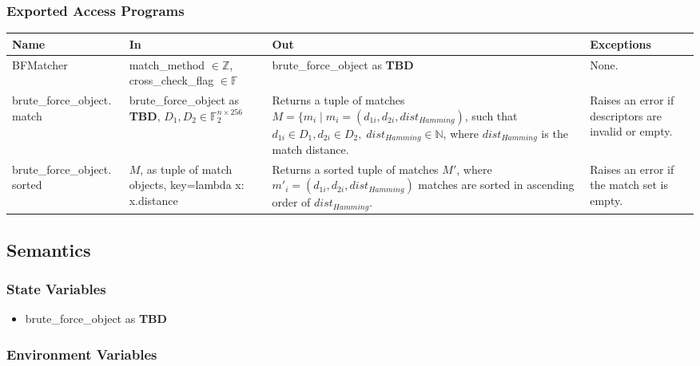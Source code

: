 \documentclass[12pt, titlepage]{article}
\begin{document}
\subsubsection{Exported Access Programs}

\begin{center}
  \begin{tabular}{p{4cm} p{4cm} p{5cm} p{3cm}}
  \hline
  \textbf{Name} & \textbf{In} & \textbf{Out} & \textbf{Exceptions} \\
  \hline
  BFMatcher & match\_method $\in \mathbb{Z}$, cross\_check\_flag $\in \mathbb{F}$ 
  & brute\_force\_object as \textbf{TBD}\newline 
  & None.\\
  \hline
  brute\_force\_object.\newline 
  match & brute\_force\_object as \textbf{TBD}, \newline
  $D_1, D_2 \in \mathbb{F}_{2}^{n\times 256}$ & 
  Returns a tuple of matches $M = \{ m_i \mid m_i = (d_{1i}, d_{2i}, dist_{Hamming})$, \newline
  such that $d_{1i} \in D_1, d_{2i} \in D_2, \; dist_{Hamming} \in \mathbb{N}$, 
  where $dist_{Hamming}$ is the match distance. & Raises an error if descriptors are 
  invalid or empty. \\
  \hline
  brute\_force\_object.\newline 
  sorted & $M$, as tuple of match objects, \newline
  key=lambda x: x.distance
  & Returns a sorted tuple of matches $M'$, where 
  $m'_i = (d_{1i}, d_{2i}, dist_{Hamming})$
  matches are sorted in ascending order of $dist_{Hamming}$. & Raises an 
  error if the match set is empty. \\
  \hline
  \end{tabular}
\end{center}

\subsection{Semantics}

\subsubsection{State Variables}
\begin{itemize} 
  \item brute\_force\_object as \textbf{TBD}
\end{itemize}

\subsubsection{Environment Variables}
\end{document}
